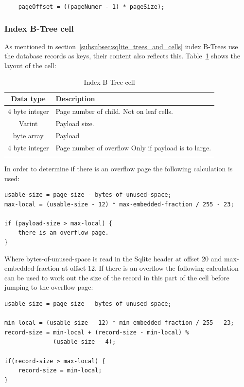 \begin{lstlisting}	
	pageOffset = ((pageNumer - 1) * pageSize);
\end{lstlisting}

\subsubsection{Index B-Tree cell}
\label{subsubsec:index_btree_cell}

As mentioned in section~\ref{subsubsec:sqlite_trees_and_cells} index B-Trees use the database records as keys, their content also reflects this. Table~\ref{tbl:index_btree_cell} shows the layout of the cell:

\begin{longtable}[h]{| c | p{5cm} |}
		\hline
			\textbf{Data type} & \textbf{Description} \\ 
		\hline
		\endhead
			4 byte integer & Page number of child. \newline 
							 Not on leaf cells.\\
		\hline
			Varint & Payload size. \\
		\hline
			byte array & Payload \\
		\hline
			4 byte integer & Page number of overflow \newline
							  Only if payload is to large.\\
		\hline
	\caption{Index B-Tree cell}
	\label{tbl:index_btree_cell}
\end{longtable}

In order to determine if there is an overflow page the following calculation is used:

\begin{lstlisting}	
usable-size = page-size - bytes-of-unused-space;
max-local = (usable-size - 12) * max-embedded-fraction / 255 - 23;

if (payload-size > max-local) {
	there is an overflow page.
}
\end{lstlisting}

Where bytes-of-unused-space is read in the Sqlite header at offset 20 and \newline max-embedded-fraction at offset 12. If there is an overflow the following calculation can be used to work out the size of the record in this part of the cell before jumping to the overflow page:  

\begin{lstlisting}	
usable-size = page-size - bytes-of-unused-space;

min-local = (usable-size - 12) * min-embedded-fraction / 255 - 23;
record-size = min-local + (record-size - min-local) % 
			  (usable-size - 4);

if(record-size > max-local) {
	record-size = min-local;
}
\end{lstlisting}

